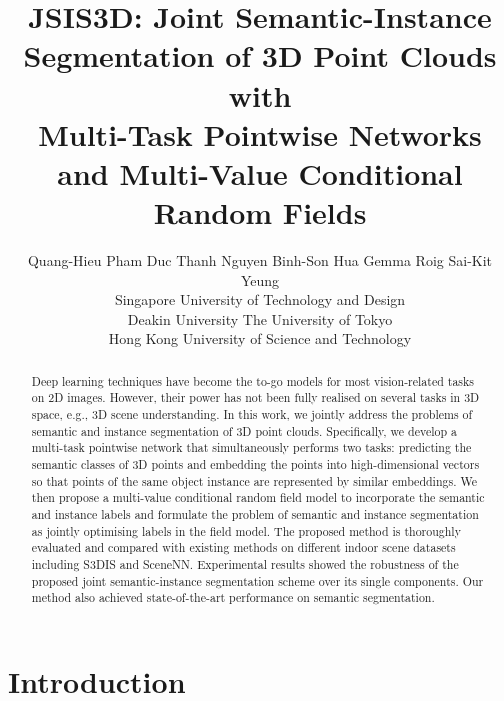 \documentclass[10pt,twocolumn,letterpaper]{article}
\begin{document}
\title{JSIS3D: Joint Semantic-Instance Segmentation of 3D Point Clouds with \\
  Multi-Task Pointwise Networks and Multi-Value Conditional Random Fields}

\author{
  Quang-Hieu Pham \hspace{0.2in}
  Duc Thanh Nguyen \hspace{0.2in}
  Binh-Son Hua \hspace{0.2in}
  Gemma Roig \hspace{0.2in}
  Sai-Kit Yeung
  \\
  Singapore University of Technology and Design
  \\
  Deakin University \hspace{0.5in}
  The University of Tokyo
  \\
  Hong Kong University of Science and Technology
}

\maketitle
\thispagestyle{empty}

\begin{abstract}
  Deep learning techniques have become the to-go models for most vision-related
  tasks on 2D images. However, their power has not been fully realised on
  several tasks in 3D space, e.g., 3D scene understanding. In this work, we
  jointly address the problems of semantic and instance segmentation of 3D point
  clouds. Specifically, we develop a multi-task pointwise network that
  simultaneously performs two tasks: predicting the semantic classes of 3D
  points and embedding the points into high-dimensional vectors so that points
  of the same object instance are represented by similar embeddings. We then
  propose a multi-value conditional random field model to incorporate the
  semantic and instance labels and formulate the problem of semantic and
  instance segmentation as jointly optimising labels in the field model. The
  proposed method is thoroughly evaluated and compared with existing methods on
  different indoor scene datasets including S3DIS and SceneNN. Experimental
  results showed the robustness of the proposed joint semantic-instance
  segmentation scheme over its single components. Our method also achieved
  state-of-the-art performance on semantic segmentation.
\end{abstract}

\section{Introduction}
\end{document}
